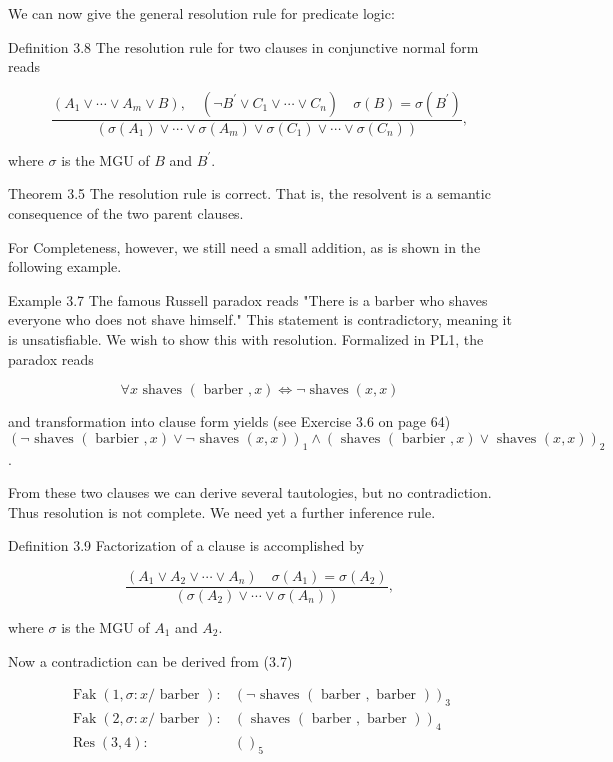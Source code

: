 \documentclass[10pt]{article}
\begin{document}
We can now give the general resolution rule for predicate logic:

Definition 3.8 The resolution rule for two clauses in conjunctive normal form reads


\begin{equation*}
\frac{\left(A_{1} \vee \cdots \vee A_{m} \vee B\right), \quad\left(\neg B^{\prime} \vee C_{1} \vee \cdots \vee C_{n}\right) \quad \sigma(B)=\sigma\left(B^{\prime}\right)}{\left(\sigma\left(A_{1}\right) \vee \cdots \vee \sigma\left(A_{m}\right) \vee \sigma\left(C_{1}\right) \vee \cdots \vee \sigma\left(C_{n}\right)\right)}, \tag{3.6}
\end{equation*}


where $\sigma$ is the MGU of $B$ and $B^{\prime}$.

Theorem 3.5 The resolution rule is correct. That is, the resolvent is a semantic consequence of the two parent clauses.

For Completeness, however, we still need a small addition, as is shown in the following example.

Example 3.7 The famous Russell paradox reads "There is a barber who shaves everyone who does not shave himself." This statement is contradictory, meaning it is unsatisfiable. We wish to show this with resolution. Formalized in PL1, the paradox reads

$$
\forall x \text { shaves }(\text { barber }, x) \Leftrightarrow \neg \operatorname{shaves}(x, x)
$$

and transformation into clause form yields (see Exercise 3.6 on page 64)\\
$(\neg \text { shaves }(\text { barbier }, x) \vee \neg \text { shaves }(x, x))_{1} \wedge(\text { shaves }(\text { barbier }, x) \vee \text { shaves }(x, x))_{2}$.

From these two clauses we can derive several tautologies, but no contradiction. Thus resolution is not complete. We need yet a further inference rule.

Definition 3.9 Factorization of a clause is accomplished by

$$
\frac{\left(A_{1} \vee A_{2} \vee \cdots \vee A_{n}\right) \quad \sigma\left(A_{1}\right)=\sigma\left(A_{2}\right)}{\left(\sigma\left(A_{2}\right) \vee \cdots \vee \sigma\left(A_{n}\right)\right)},
$$

where $\sigma$ is the MGU of $A_{1}$ and $A_{2}$.

Now a contradiction can be derived from (3.7)

$$
\begin{aligned}
\operatorname{Fak}(1, \sigma: x / \text { barber }): & (\neg \text { shaves }(\text { barber }, \text { barber }))_{3} \\
\operatorname{Fak}(2, \sigma: x / \text { barber }): & (\text { shaves }(\text { barber }, \text { barber }))_{4} \\
\operatorname{Res}(3,4): & ()_{5}
\end{aligned}
$$
\end{document}
